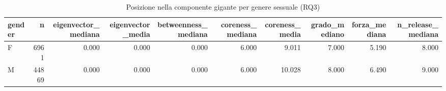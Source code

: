 \begin{table}
\centering
\caption{Posizione nella componente gigante per genere sessuale (RQ3)}
\label{tab:t3_posizione_per_genere}
\begin{tabular}{lrrrrrrrrr}
\toprule
gender &     n &  eigenvector\_mediana &  eigenvector\_media &  betweenness\_mediana &  coreness\_mediana &  coreness\_media &  grado\_mediano &  forza\_mediana &  n\_release\_mediana \\
\midrule
     F &  6961 &                0.000 &              0.000 &                0.000 &             6.000 &           9.011 &          7.000 &          5.190 &              8.000 \\
     M & 44869 &                0.000 &              0.000 &                0.000 &             6.000 &          10.028 &          8.000 &          6.490 &              9.000 \\
\bottomrule
\end{tabular}
\end{table}
